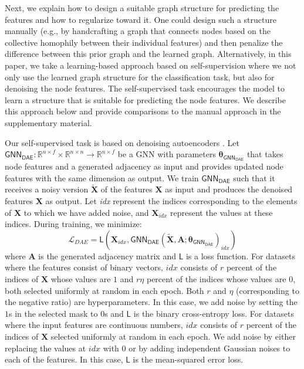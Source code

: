 \documentclass{article}
\def\mA{{\bm{A}}}
\def\mX{{\bm{X}}}
\newcommand{\loss}[1]{\ensuremath{\mathcal{#1}}}
\newcommand{\func}[1]{\ensuremath{\mathsf{#1}}}
\begin{document}
Next, we explain how to design a suitable graph structure for predicting the features and how to regularize toward it. One could design such a structure manually (e.g., by handcrafting a graph that connects nodes based on the collective homophily between their individual features) and then penalize the difference between this prior graph and the learned graph. Alternatively, in this paper, we take a learning-based approach based on self-supervision where we not only use the learned graph structure for the classification task, but also for denoising the node features. The self-supervised task encourages the model to learn a structure that is suitable for predicting the node features. We describe this approach below and provide comparisons to the manual approach in the supplementary material.

Our self-supervised task is based on denoising autoencoders \citep{vincent2008extracting}. Let $\func{GNN_{DAE}}:\mathbb{R}^{n\times f}\times \mathbb{R}^{n\times n}\rightarrow \mathbb{R}^{n\times f}$ be a GNN with parameters $\bm{\theta}_{\func{GNN_{DAE}}}$ that takes node features and a generated adjacency as input and provides updated node features with the same dimension as output. We train $\func{GNN_{DAE}}$ such that it receives a noisy version $\tilde{\mX}$ of the features $\mX$ as input and produces the denoised features $\mX$ as output. Let \emph{idx} represent the indices corresponding to the elements of $\mX$ to which we have added noise, and $\mX_{idx}$ represent the values at these indices. During training, we minimize:
\begin{equation}\label{eq-loss-dae}
    \loss{L}_{DAE}= \func{L}(\mX_{idx}, \func{\func{GNN_{DAE}}}(\tilde{\mX}, \mA; \bm{\theta}_{\func{GNN_{DAE}}})_{idx})
\end{equation}
where $\mA$ is the generated adjacency matrix and $\func{L}$ is a loss function.
For datasets where the features consist of binary vectors, $idx$ consists of $r$ percent of the indices of $\mX$ whose values are $1$ and $r\eta$ percent of the indices whose values are $0$, both selected uniformly at random in each epoch. Both $r$ and $\eta$ (corresponding to the negative ratio) are hyperparameters. In this case, we add noise by setting the $1$s in the selected mask to $0$s and $\func{L}$ is the binary cross-entropy loss. For datasets where the input features are continuous numbers, $idx$ consists of $r$ percent of the indices of $\mX$ selected uniformly at random in each epoch. We add noise by either replacing the values at $idx$ with $0$ or by adding independent Gaussian noises to each of the features. In this case, $\func{L}$ is the mean-squared error loss.
\end{document}
